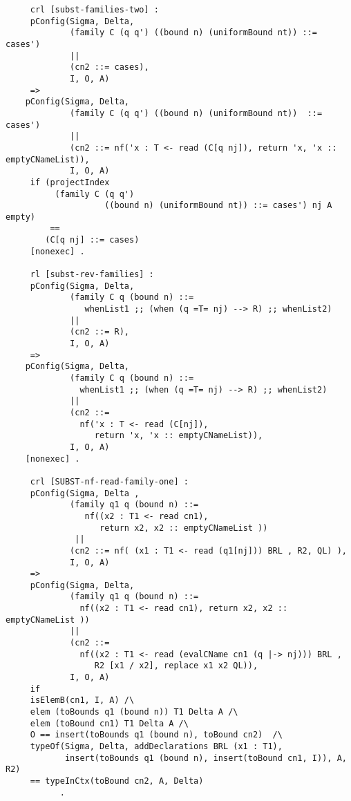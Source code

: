 \begin{lstlisting}
     crl [subst-families-two] :
     pConfig(Sigma, Delta, 
             (family C (q q') ((bound n) (uniformBound nt)) ::= cases')
             ||
             (cn2 ::= cases),
             I, O, A)
     => 
    pConfig(Sigma, Delta, 
             (family C (q q') ((bound n) (uniformBound nt))  ::= cases')
             ||
             (cn2 ::= nf('x : T <- read (C[q nj]), return 'x, 'x :: emptyCNameList)),
             I, O, A) 
     if (projectIndex 
          (family C (q q') 
                    ((bound n) (uniformBound nt)) ::= cases') nj A empty)
         == 
        (C[q nj] ::= cases)
     [nonexec] .
     
     rl [subst-rev-families] :
     pConfig(Sigma, Delta, 
             (family C q (bound n) ::= 
                whenList1 ;; (when (q =T= nj) --> R) ;; whenList2)
             ||
             (cn2 ::= R),
             I, O, A)
     => 
    pConfig(Sigma, Delta, 
             (family C q (bound n) ::= 
               whenList1 ;; (when (q =T= nj) --> R) ;; whenList2)
             ||
             (cn2 ::= 
               nf('x : T <- read (C[nj]), 
                  return 'x, 'x :: emptyCNameList)),
             I, O, A) 
    [nonexec] .             
     
     crl [SUBST-nf-read-family-one] : 
     pConfig(Sigma, Delta ,
             (family q1 q (bound n) ::= 
                nf((x2 : T1 <- read cn1), 
                   return x2, x2 :: emptyCNameList )) 
              || 
             (cn2 ::= nf( (x1 : T1 <- read (q1[nj])) BRL , R2, QL) ),
             I, O, A)  
     => 
     pConfig(Sigma, Delta,
             (family q1 q (bound n) ::= 
               nf((x2 : T1 <- read cn1), return x2, x2 :: emptyCNameList ))
             || 
             (cn2 ::= 
               nf((x2 : T1 <- read (evalCName cn1 (q |-> nj))) BRL , 
                  R2 [x1 / x2], replace x1 x2 QL)),
             I, O, A) 
     if 
     isElemB(cn1, I, A) /\
     elem (toBounds q1 (bound n)) T1 Delta A /\
     elem (toBound cn1) T1 Delta A /\
     O == insert(toBounds q1 (bound n), toBound cn2)  /\
     typeOf(Sigma, Delta, addDeclarations BRL (x1 : T1), 
            insert(toBounds q1 (bound n), insert(toBound cn1, I)), A, R2)
     == typeInCtx(toBound cn2, A, Delta) 
           . 
     

\end{lstlisting}
